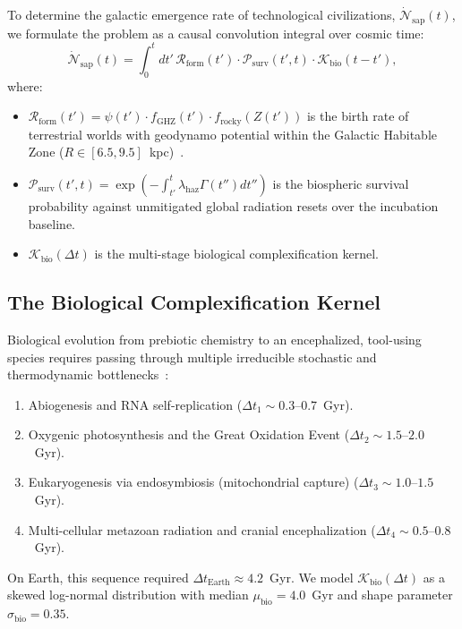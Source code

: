 \documentclass[11pt,a4paper]{article}
\begin{document}
To determine the galactic emergence rate of technological civilizations, $\dot{\mathcal{N}}_{\mathrm{sap}}(t)$, we formulate the problem as a causal convolution integral over cosmic time:
\begin{equation}
\dot{\mathcal{N}}_{\mathrm{sap}}(t) = \int_0^t dt' \, \mathcal{R}_{\mathrm{form}}(t') \cdot \mathcal{P}_{\mathrm{surv}}(t', t) \cdot \mathcal{K}_{\mathrm{bio}}(t - t'),
\label{eq:convolution}
\end{equation}
where:
\begin{itemize}
    \item $\mathcal{R}_{\mathrm{form}}(t') = \psi(t') \cdot f_{\mathrm{GHZ}}(t') \cdot f_{\mathrm{rocky}}(Z(t'))$ is the birth rate of terrestrial worlds with geodynamo potential within the Galactic Habitable Zone ($R \in [6.5, 9.5]$~kpc)~\cite{lineweaver2004}.
    \item $\mathcal{P}_{\mathrm{surv}}(t', t) = \exp\left( -\int_{t'}^t \lambda_{\mathrm{haz}} \Gamma(t'') dt'' \right)$ is the biospheric survival probability against unmitigated global radiation resets over the incubation baseline.
    \item $\mathcal{K}_{\mathrm{bio}}(\Delta t)$ is the multi-stage biological complexification kernel.
\end{itemize}

\subsection{The Biological Complexification Kernel}

Biological evolution from prebiotic chemistry to an encephalized, tool-using species requires passing through multiple irreducible stochastic and thermodynamic bottlenecks~\cite{carter1983,kipping2020}:
\begin{enumerate}
    \item Abiogenesis and RNA self-replication ($\Delta t_1 \sim 0.3\text{--}0.7$~Gyr).
    \item Oxygenic photosynthesis and the Great Oxidation Event ($\Delta t_2 \sim 1.5\text{--}2.0$~Gyr).
    \item Eukaryogenesis via endosymbiosis (mitochondrial capture) ($\Delta t_3 \sim 1.0\text{--}1.5$~Gyr).
    \item Multi-cellular metazoan radiation and cranial encephalization ($\Delta t_4 \sim 0.5\text{--}0.8$~Gyr).
\end{enumerate}
On Earth, this sequence required $\Delta t_{\mathrm{Earth}} \approx 4.2$~Gyr. We model $\mathcal{K}_{\mathrm{bio}}(\Delta t)$ as a skewed log-normal distribution with median $\mu_{\mathrm{bio}} = 4.0$~Gyr and shape parameter $\sigma_{\mathrm{bio}} = 0.35$.
\end{document}
